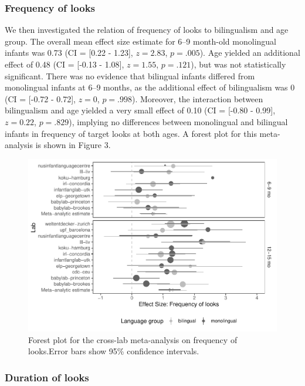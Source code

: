 \documentclass[
  english,
  ,man,floatsintext]{apa6}
\begin{document}
\hypertarget{frequency-of-looks-1}{%
\subsubsection{Frequency of looks}\label{frequency-of-looks-1}}

We then investigated the relation of frequency of looks to bilingualism and age group. The overall mean effect size estimate for 6--9 month-old monolingual infants was 0.73 (CI = {[}0.22 - 1.23{]}, \(z = 2.83\), \(p = .005\)). Age yielded an additional effect of 0.48 (CI = {[}-0.13 - 1.08{]}, \(z = 1.55\), \(p = .121\)), but was not statistically significant. There was no evidence that bilingual infants differed from monolingual infants at 6--9 months, as the additional effect of bilingualism was 0 (CI = {[}-0.72 - 0.72{]}, \(z = 0\), \(p = .998\)). Moreover, the interaction between bilingualism and age yielded a very small effect of 0.10 (CI = {[}-0.80 - 0.99{]}, \(z = 0.22\), \(p = .829\)), implying no differences between monolingual and bilingual infants in frequency of target looks at both ages. A forest plot for this meta-analysis is shown in Figure 3.

\begin{figure}
\centering
\includegraphics{gaze-following-paper_files/figure-latex/fig3-1.pdf}
\caption{\label{fig:fig3}Forest plot for the cross-lab meta-analysis on frequency of looks.Error bars show 95\% confidence intervals.}
\end{figure}

\hypertarget{duration-of-looks-1}{%
\subsubsection{Duration of looks}\label{duration-of-looks-1}}
\end{document}
